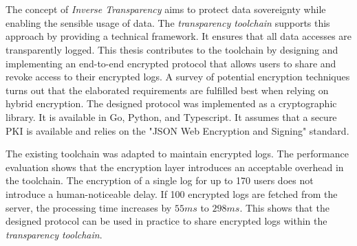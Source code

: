 \documentclass[../main.tex]{subfiles}
\begin{document}
\chapter*{\myAbstractTitle}

The concept of \emph{Inverse Transparency} aims to protect data sovereignty while enabling the sensible usage of data.
The \emph{transparency toolchain} supports this approach by providing a technical framework.
It ensures that all data accesses are transparently logged.
This thesis contributes to the toolchain by designing and implementing an end-to-end encrypted protocol that allows users to share and revoke access to their encrypted logs.
A survey of potential encryption techniques turns out that the elaborated requirements are fulfilled best when relying on hybrid encryption.
The designed protocol was implemented as a cryptographic library.
It is available in Go, Python, and Typescript.
It assumes that a secure PKI is available and relies on the "JSON Web Encryption and Signing" standard.

The existing toolchain was adapted to maintain encrypted logs.
The performance evaluation shows that the encryption layer introduces an acceptable overhead in the toolchain.
The encryption of a single log for up to 170 users does not introduce a human-noticeable delay.
If 100 encrypted logs are fetched from the server, the processing time increases by $55ms$ to $298ms$.
This shows that the designed protocol can be used in practice to share encrypted logs within the \emph{transparency toolchain}.
\end{document}
